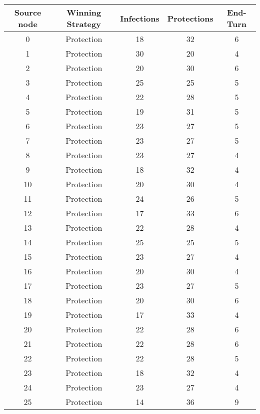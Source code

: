 \documentclass[results.tex]{subfiles}
\begin{document}
\begin{center}
  \begin{tabular}{| c || c | c | c | c |}
    \hline
    {\bfseries Source node} & {\bfseries Winning Strategy} & {\bfseries Infections} & {\bfseries Protections} & {\bfseries End-Turn} \\  %
    \hline\hline
    0 & Protection & 18 & 32 & 6 \\ 
    \hline
    1 & Protection & 30 & 20 & 4 \\ 
    \hline
    2 & Protection & 20 & 30 & 6 \\ 
    \hline
    3 & Protection & 25 & 25 & 5 \\ 
    \hline
    4 & Protection & 22 & 28 & 5 \\ 
    \hline
    5 & Protection & 19 & 31 & 5 \\ 
    \hline
    6 & Protection & 23 & 27 & 5 \\ 
    \hline
    7 & Protection & 23 & 27 & 5 \\ 
    \hline
    8 & Protection & 23 & 27 & 4 \\ 
    \hline
    9 & Protection & 18 & 32 & 4 \\ 
    \hline
    10 & Protection & 20 & 30 & 4 \\ 
    \hline
    11 & Protection & 24 & 26 & 5 \\ 
    \hline
    12 & Protection & 17 & 33 & 6 \\ 
    \hline
    13 & Protection & 22 & 28 & 4 \\ 
    \hline
    14 & Protection & 25 & 25 & 5 \\ 
    \hline
    15 & Protection & 23 & 27 & 4 \\ 
    \hline
    16 & Protection & 20 & 30 & 4 \\ 
    \hline
    17 & Protection & 23 & 27 & 5 \\ 
    \hline
    18 & Protection & 20 & 30 & 6 \\ 
    \hline
    19 & Protection & 17 & 33 & 4 \\ 
    \hline
    20 & Protection & 22 & 28 & 6 \\ 
    \hline
    21 & Protection & 22 & 28 & 6 \\ 
    \hline
    22 & Protection & 22 & 28 & 5 \\ 
    \hline
    23 & Protection & 18 & 32 & 4 \\ 
    \hline
    24 & Protection & 23 & 27 & 4 \\ 
    \hline
    25 & Protection & 14 & 36 & 9 \\ 

\end{tabular}
\end{center}
\end{document}
